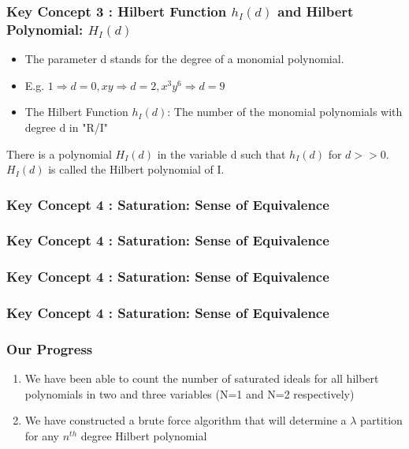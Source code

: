 \documentclass{beamer}
\begin{document}
\begin{frame}
\frametitle{Key Concept 3 : Hilbert Function \(h_I(d)\) and Hilbert Polynomial: \(H_I(d)\)}
\begin{itemize}
	\item The parameter d stands for the degree of a monomial polynomial.
	\item E.g. \(1 \Rightarrow d = 0, xy \Rightarrow d = 2, x^3y^6 \Rightarrow d = 9\)
	\item The Hilbert Function \(h_I(d)\): The number of the monomial polynomials with degree d in "R/I"
\end{itemize}
\begin{theorem}
	There is a polynomial \(H_I(d)\) in the variable d such that \(h_I(d)\) for \(d >> 0\). \(H_I(d)\) is called the Hilbert polynomial of I.
\end{theorem}
\end{frame}

\begin{frame}
\frametitle{Key Concept 4 : Saturation: Sense of Equivalence}
	
\end{frame}

\begin{frame}
\frametitle{Key Concept 4 : Saturation: Sense of Equivalence}
	
\end{frame}

\begin{frame}
\frametitle{Key Concept 4 : Saturation: Sense of Equivalence}
	
\end{frame}

\begin{frame}
\frametitle{Key Concept 4 : Saturation: Sense of Equivalence}
	
\end{frame}



\begin{frame}
	\frametitle{Our Progress}
	\begin{enumerate}
	\item We have been able to count the number of saturated ideals for all hilbert polynomials in two and three variables (N=1 and N=2 respectively)
	\item We have constructed a brute force algorithm that will determine a $\lambda$ partition for any $n^{th}$ degree Hilbert polynomial
	\end{enumerate}
\end{frame}
\end{document}
